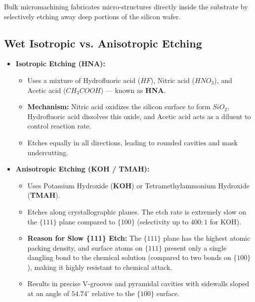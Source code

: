 \documentclass[12pt,a4paper]{article}
\begin{document}
Bulk micromachining fabricates micro-structures directly inside the substrate by selectively etching away deep portions of the silicon wafer.

\subsection{Wet Isotropic vs. Anisotropic Etching}
\begin{itemize}[leftmargin=*, itemsep=4pt]
  \item \textbf{Isotropic Etching (HNA):}
    \begin{itemize}[leftmargin=*, itemsep=2.5pt]
      \item Uses a mixture of Hydrofluoric acid ($HF$), Nitric acid ($HNO_3$), and Acetic acid ($CH_3COOH$) --- known as \textbf{HNA}.
      \item \textbf{Mechanism:} Nitric acid oxidizes the silicon surface to form $SiO_2$, Hydrofluoric acid dissolves this oxide, and Acetic acid acts as a diluent to control reaction rate.
      \item Etches equally in all directions, leading to rounded cavities and mask undercutting.
    \end{itemize}
  \item \textbf{Anisotropic Etching (KOH / TMAH):}
    \begin{itemize}[leftmargin=*, itemsep=2.5pt]
      \item Uses Potassium Hydroxide (\textbf{KOH}) or Tetramethylammonium Hydroxide (\textbf{TMAH}).
      \item Etches along crystallographic planes. The etch rate is extremely slow on the $\{111\}$ plane compared to $\{100\}$ (selectivity up to $400:1$ for KOH).
      \item \textbf{Reason for Slow \{111\} Etch:} The $\{111\}$ plane has the highest atomic packing density, and surface atoms on $\{111\}$ present only a single dangling bond to the chemical solution (compared to two bonds on $\{100\}$), making it highly resistant to chemical attack.
      \item Results in precise V-grooves and pyramidal cavities with sidewalls sloped at an angle of $54.74^{\circ}$ relative to the $\{100\}$ surface.
    \end{itemize}
\end{itemize}
\end{document}
